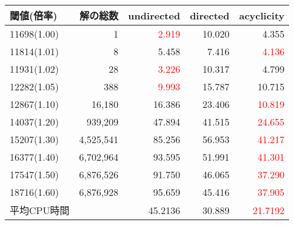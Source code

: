   \begin{tabular}{lr|rrr}
    \hline
    閾値(倍率)    &	解の総数 & \textsf{undirected} & \textsf{directed} & \textsf{acyclicity} \\
    \hline
    11698(1.00)   &	1      &\textcolor{red}{2.919} &10.020 & 4.355	\\
    11814(1.01)   &	8      &5.458  &7.416	& \textcolor{red}{4.136}	\\
    11931(1.02)   &	28     &\textcolor{red}{3.226}&10.317	& 4.799	\\
    12282(1.05)   &	388    &\textcolor{red}{9.993}&15.787	& 10.715	\\
    12867(1.10)   &	16,180  &16.386       &23.406	& \textcolor{red}{10.819}\\
    14037(1.20)   &	939,209 &47.894       &41.515	& \textcolor{red}{24.655}\\
    15207(1.30)   &	4,525,541&85.256       &56.953	& \textcolor{red}{41.217}\\
    16377(1.40)   &	6,702,964&93.595       &51.991	& \textcolor{red}{41.301}	\\
    17547(1.50)   &	6,876,526&91.750       &46.065	& \textcolor{red}{37.290}	\\
    18716(1.60)   &	6,876,928&95.659       &45.416	& \textcolor{red}{37.905}	\\
    \hline
    平均CPU時間 &   & 45.2136 & 30.889  & \textcolor{red}{21.7192}\\\hline
  \end{tabular}
